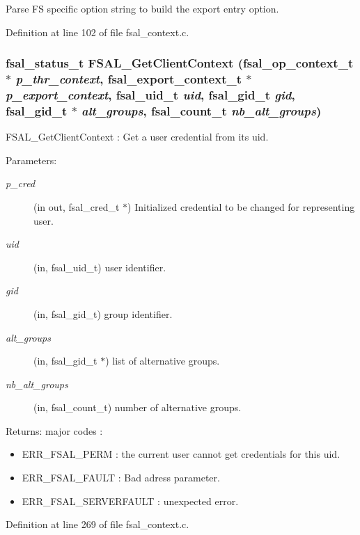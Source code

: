 Parse FS specific option string to build the export entry option. 

Definition at line 102 of file fsal\_\-context.c.
\subsubsection[{FSAL\_\-GetClientContext}]{\setlength{\rightskip}{0pt plus 5cm}fsal\_\-status\_\-t FSAL\_\-GetClientContext (fsal\_\-op\_\-context\_\-t $\ast$ {\em p\_\-thr\_\-context}, \/  fsal\_\-export\_\-context\_\-t $\ast$ {\em p\_\-export\_\-context}, \/  fsal\_\-uid\_\-t {\em uid}, \/  fsal\_\-gid\_\-t {\em gid}, \/  fsal\_\-gid\_\-t $\ast$ {\em alt\_\-groups}, \/  fsal\_\-count\_\-t {\em nb\_\-alt\_\-groups})}\label{group__FSALCredFunctions_gc9d7f36333e895d045a6e484589fda10}


FSAL\_\-GetClientContext : Get a user credential from its uid.

\begin{Desc}
\item[Parameters:]
\begin{description}
\item[{\em p\_\-cred}](in out, fsal\_\-cred\_\-t $\ast$) Initialized credential to be changed for representing user. \item[{\em uid}](in, fsal\_\-uid\_\-t) user identifier. \item[{\em gid}](in, fsal\_\-gid\_\-t) group identifier. \item[{\em alt\_\-groups}](in, fsal\_\-gid\_\-t $\ast$) list of alternative groups. \item[{\em nb\_\-alt\_\-groups}](in, fsal\_\-count\_\-t) number of alternative groups.\end{description}
\end{Desc}
\begin{Desc}
\item[Returns:]major codes :\begin{itemize}
\item ERR\_\-FSAL\_\-PERM : the current user cannot get credentials for this uid.\item ERR\_\-FSAL\_\-FAULT : Bad adress parameter.\item ERR\_\-FSAL\_\-SERVERFAULT : unexpected error. \end{itemize}
\end{Desc}


Definition at line 269 of file fsal\_\-context.c.